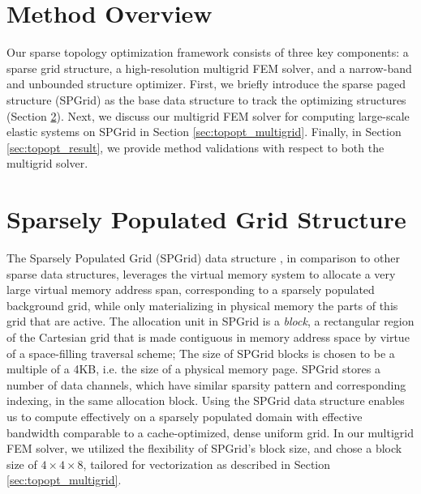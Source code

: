 \section{Method Overview}
Our sparse topology optimization framework consists of three key components: a sparse grid structure, a high-resolution multigrid FEM solver, and a narrow-band and unbounded structure optimizer. 
First, we briefly introduce the sparse paged structure (SPGrid) \cite{setaluri2014spgrid} as the base data structure to track the optimizing structures (Section \ref{sec:topopt_spgrid}). 
Next, we discuss our multigrid FEM solver for computing large-scale elastic systems on SPGrid in Section \ref{sec:topopt_multigrid}. 
Finally, in Section \ref{sec:topopt_result}, we provide method validations with respect to both the multigrid solver.

\section{Sparsely Populated Grid Structure}\label{sec:topopt_spgrid}
The Sparsely Populated Grid (SPGrid) data structure \cite{setaluri2014spgrid}, in comparison to other sparse  data structures, leverages the virtual memory system to allocate a very large virtual memory address span, corresponding to a sparsely populated background grid, while only materializing in physical memory the parts of this grid that are active. The allocation unit in SPGrid is a \emph{block}, a rectangular region of the Cartesian grid that is made contiguous in memory address space by virtue of a space-filling traversal scheme; The size of SPGrid blocks is chosen to be a multiple of a 4KB, i.e. the size of a physical memory page. SPGrid stores a number of data channels, which have similar sparsity pattern and corresponding indexing, in the same allocation block. Using the SPGrid data structure enables us to compute effectively on a sparsely populated domain with effective bandwidth comparable to a cache-optimized, dense uniform grid. In our multigrid FEM solver, we utilized the flexibility of SPGrid's block size, and chose a block size of $4\times 4\times 8$, tailored for vectorization as described in Section \ref{sec:topopt_multigrid}.
